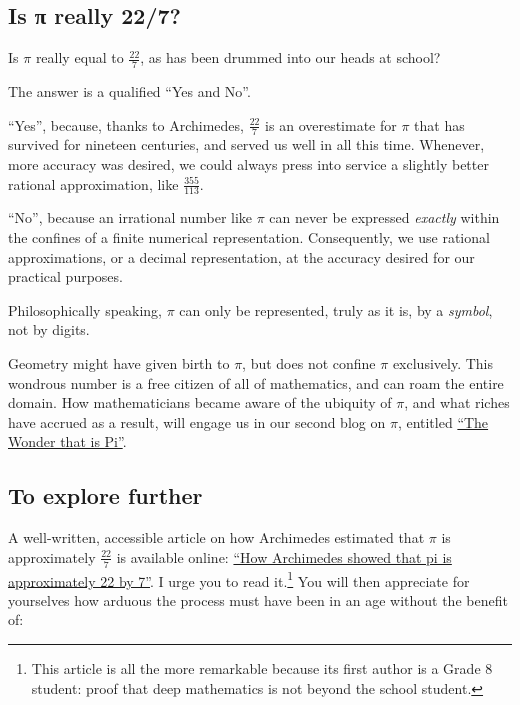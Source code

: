 \documentclass[
  a4paper,
]{article}
\begin{document}
\subsection{Is π really 22/7?}\label{is-ux3c0-really-227}

Is \(\pi\) really equal to \(\frac{22}{7}\), as has been drummed into
our heads at school?

The answer is a qualified ``Yes and No''.

``Yes'', because, thanks to Archimedes, \(\frac{22}{7}\) is an
overestimate for \(\pi\) that has survived for nineteen centuries, and
served us well in all this time. Whenever, more accuracy was desired, we
could always press into service a slightly better rational
approximation, like
\href{https://en.wikipedia.org/wiki/Mil\%C3\%BC}{\(\frac{355}{113}\)}.

``No'', because an irrational number like \(\pi\) can never be expressed
\emph{exactly} within the confines of a finite numerical representation.
Consequently, we use rational approximations, or a decimal
representation, at the accuracy desired for our practical purposes.

Philosophically speaking, \(\pi\) can only be represented, truly as it
is, by a \emph{symbol}, not by digits.

Geometry might have given birth to \(\pi\), but does not confine \(\pi\)
exclusively. This wondrous number is a free citizen of all of
mathematics, and can roam the entire domain. How mathematicians became
aware of the ubiquity of \(\pi\), and what riches have accrued as a
result, will engage us in our second blog on \(\pi\), entitled
\href{}{``The Wonder that is Pi''}.

\subsection{To explore further}\label{to-explore-further}

A well-written, accessible article on how Archimedes estimated that
\(\pi\) is approximately \(\frac{22}{7}\) is available online:
\href{https://publications.azimpremjiuniversity.edu.in/3356/1/02-DaminiAndAbhishek_PiIs22By7_Final.pdf}{``How
Archimedes showed that pi is approximately 22 by 7''}. I urge you to
read it.\footnote{This article is all the more remarkable because its
  first author is a Grade 8 student: proof that deep mathematics is not
  beyond the school student.} You will then appreciate for yourselves
how arduous the process must have been in an age without the benefit of:
\end{document}
